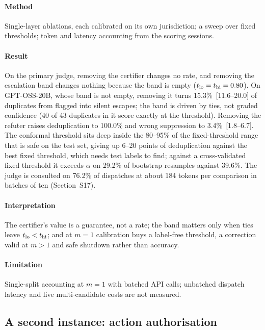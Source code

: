 \paragraph{Method} Single-layer ablations, each calibrated on its own jurisdiction; a sweep over fixed thresholds; token and latency accounting from the scoring sessions.

\paragraph{Result} On the primary judge, removing the certifier changes no rate, and removing the escalation band changes nothing because the band is empty ($t_{\mathrm{lo}}=t_{\mathrm{hi}}=0.80$). On GPT-OSS-20B, whose band is not empty, removing it turns 15.3\%~[11.6--20.0] of duplicates from flagged into silent escapes; the band is driven by ties, not graded confidence (40 of 43 duplicates in it score exactly at the threshold). Removing the refuter raises deduplication to 100.0\% and wrong suppression to 3.4\%~[1.8--6.7]. The conformal threshold sits deep inside the 80--95\% of the fixed-threshold range that is safe on the test set, giving up 6--20 points of deduplication against the best fixed threshold, which needs test labels to find; against a cross-validated fixed threshold it exceeds $\alpha$ on 29.2\% of bootstrap resamples against 39.6\%. The judge is consulted on 76.2\% of dispatches at about 184 tokens per comparison in batches of ten (Section~S17).

\paragraph{Interpretation} The certifier's value is a guarantee, not a rate; the band matters only when ties leave $t_{\mathrm{lo}}<t_{\mathrm{hi}}$; and at $m=1$ calibration buys a label-free threshold, a correction valid at $m>1$ and safe shutdown rather than accuracy.

\paragraph{Limitation} Single-split accounting at $m=1$ with batched API calls; unbatched dispatch latency and live multi-candidate costs are not measured.

\subsection{A second instance: action authorisation}\label{sec:res-authz}

